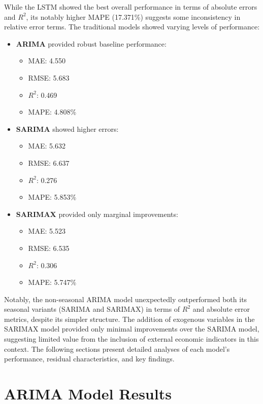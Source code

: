 \documentclass[12pt,a4paper]{report}
\begin{document}
While the LSTM showed the best overall performance in terms of absolute errors and $R^2$, its notably higher MAPE (17.371\%) suggests some inconsistency in relative error terms. The traditional models showed varying levels of performance:

\begin{itemize}
    \item \textbf{ARIMA} provided robust baseline performance:
    \begin{itemize}
        \item MAE: 4.550
        \item RMSE: 5.683
        \item $R^2$: 0.469
        \item MAPE: 4.808\%
    \end{itemize}
    
    \item \textbf{SARIMA} showed higher errors:
    \begin{itemize}
        \item MAE: 5.632
        \item RMSE: 6.637
        \item $R^2$: 0.276
        \item MAPE: 5.853\%
    \end{itemize}
    
    \item \textbf{SARIMAX} provided only marginal improvements:
    \begin{itemize}
        \item MAE: 5.523
        \item RMSE: 6.535
        \item $R^2$: 0.306
        \item MAPE: 5.747\%
    \end{itemize}
\end{itemize}

Notably, the non-seasonal ARIMA model unexpectedly outperformed both its seasonal variants (SARIMA and SARIMAX) in terms of $R^2$ and absolute error metrics, despite its simpler structure. The addition of exogenous variables in the SARIMAX model provided only minimal improvements over the SARIMA model, suggesting limited value from the inclusion of external economic indicators in this context. The following sections present detailed analyses of each model's performance, residual characteristics, and key findings.
\fussy

\section{ARIMA Model Results}
\end{document}
